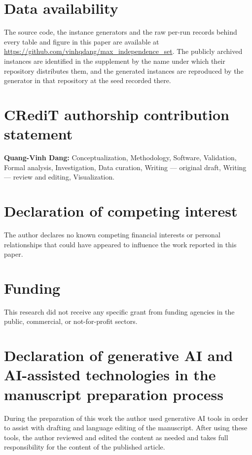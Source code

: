 \documentclass[review,authoryear,11pt]{elsarticle}
\theoremstyle{definition}
\begin{document}
\section*{Data availability}
The source code, the instance generators and the raw per-run records behind
every table and figure in this paper are available at
\url{https://github.com/vinhqdang/max_independence_set}. The publicly archived
instances are identified in the supplement by the name under
which their repository distributes them, and the generated instances are
reproduced by the generator in that repository at the seed recorded there.

\section*{CRediT authorship contribution statement}
\textbf{Quang-Vinh Dang:} Conceptualization, Methodology, Software, Validation,
Formal analysis, Investigation, Data curation, Writing --- original draft,
Writing --- review and editing, Visualization.

\section*{Declaration of competing interest}
The author declares no known competing financial interests or personal
relationships that could have appeared to influence the work reported in this
paper.

\section*{Funding}
This research did not receive any specific grant from funding agencies in the
public, commercial, or not-for-profit sectors.

\section*{Declaration of generative AI and AI-assisted technologies in the
manuscript preparation process}
During the preparation of this work the author used generative AI tools in order
to assist with drafting and language editing of the manuscript. After using
these tools, the author reviewed and edited the content as needed and takes full
responsibility for the content of the published article.


{\small}
\end{document}
